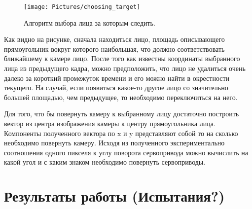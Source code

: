 \documentclass[12pt]{report}
\begin{document}
\begin{figure}[h]
	\centering
	\texttt{[image: Pictures/choosing\_target]}	
	\caption{Алгоритм выбора лица за которым следить.}
	\label{fig:choosing_face}
\end{figure}

Как видно на рисунке, сначала находиться лицо, площадь описывающего прямоугольник вокруг которого наибольшая, что 
должно соответствовать ближайшему к камере лицо. После того как известны координаты выбранного лица из предыдущего 
кадра, можно предположить, что лицо не удалиться очень далеко за короткий промежуток времени и его можно найти в 
окрестности текущего. На случай, если появиться какое-то другое лицо со значительно большей площадью, чем 
предыдущее, 
то необходимо переключиться на него. 

Для того, что бы повернуть камеру к выбранному лицу достаточно построить вектор из центра изображения камеры к 
центру  
прямоугольника лица. Компоненты полученного вектора по x и y представляют собой то на сколько необходимо повернуть 
камеру. Исходя из полученного экспериментально соотношения одного пикселя к углу поворота сервопривода можно 
вычислить на какой угол и с каким знаком необходимо повернуть сервоприводы.




\chapter{Результаты работы (Испытания?)}
\thispagestyle{fancy}
\end{document}
